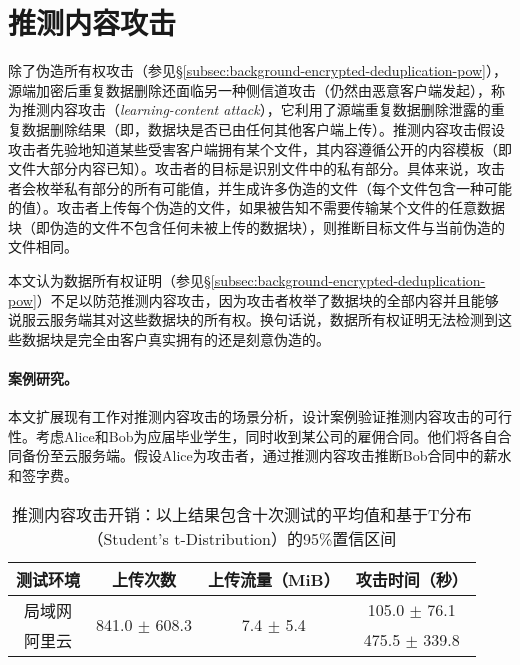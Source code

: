 \section{推测内容攻击}
\label{sec:featurespy-attack}

除了伪造所有权攻击（参见\S\ref{subsec:background-encrypted-deduplication-pow}），源端加密后重复数据删除还面临另一种侧信道攻击（仍然由恶意客户端发起），称为推测内容攻击（{\em learning-content attack}）\cite{harnik2010side, zuo2018mitigating}，它利用了源端重复数据删除泄露的重复数据删除结果（即，数据块是否已由任何其他客户端上传）。推测内容攻击假设攻击者先验地知道某些受害客户端拥有某个文件，其内容遵循公开的内容模板（即文件大部分内容已知）。攻击者的目标是识别文件中的私有部分。具体来说，攻击者会枚举私有部分的所有可能值，并生成许多伪造的文件（每个文件包含一种可能的值）。攻击者上传每个伪造的文件，如果被告知不需要传输某个文件的任意数据块（即伪造的文件不包含任何未被上传的数据块），则推断目标文件与当前伪造的文件相同。

本文认为数据所有权证明\cite{halevi11}（参见\S\ref{subsec:background-encrypted-deduplication-pow}）不足以防范推测内容攻击，因为攻击者枚举了数据块的全部内容并且能够说服云服务端其对这些数据块的所有权。换句话说，数据所有权证明无法检测到这些数据块是完全由客户真实拥有的还是刻意伪造的。

\paragraph*{案例研究。}
本文扩展现有工作\cite{harnik2010side,zuo2018mitigating}对推测内容攻击的场景分析，设计案例验证推测内容攻击的可行性。考虑Alice和Bob为应届毕业学生，同时收到某公司的雇佣合同。他们将各自合同备份至云服务端。假设Alice为攻击者，通过推测内容攻击推断Bob合同中的薪水和签字费。

\begin{table}[!htb]
    \small
    \centering
    \begin{tabular}{@{}cccc@{}}
    \toprule
    测试环境 & 上传次数                            & 上传流量（MiB）                       & 攻击时间（秒）        \\ \midrule
    局域网  & \multirow{2}{*}{841.0 $\pm$ 608.3} & \multirow{2}{*}{7.4 $\pm$ 5.4} & 105.0 $\pm$ 76.1 \\
    阿里云  &                                 &                                 & 475.5 $\pm$ 339.8 \\
    \bottomrule
    \end{tabular}
    \caption{推测内容攻击开销：以上结果包含十次测试的平均值和基于T分布（Student's t-Distribution）的95\%置信区间}
    \label{tab:LRI-verify}
\end{table}

